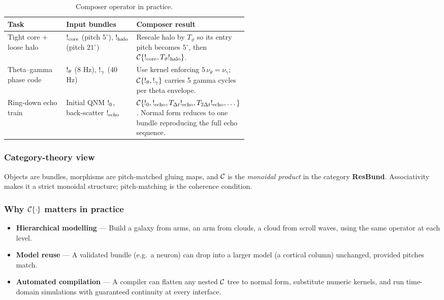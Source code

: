 \begin{table}[H]
  \small
  \centering
  \caption{Composer operator in practice.}
  \label{tab:composer-examples}
  \renewcommand{\arraystretch}{1.15}
  \begin{tabularx}{\linewidth}{@{}p{0.25\linewidth} p{0.30\linewidth} X@{}}
    \toprule
    \textbf{Task}                  & \textbf{Input bundles}                                               & \textbf{Composer result} \\
    \midrule
    Tight core + loose halo        & \(\mathsf{!}_{\mathrm{core}}\) (pitch \(5^\circ\)), \(\mathsf{!}_{\mathrm{halo}}\) (pitch \(21^\circ\)) &
      Rescale halo by \(T_{\vartheta}\) so its entry pitch becomes \(5^\circ\), then \(\mathcal{C}\{\mathsf{!}_{\mathrm{core}},T_{\vartheta}\mathsf{!}_{\mathrm{halo}}\}\). \\
    Theta–gamma phase code         & \(\mathsf{!}_{\theta}\) (8 Hz), \(\mathsf{!}_{\gamma}\) (40 Hz)                       &
      Use kernel enforcing \(5\,\nu_{\theta}=\nu_{\gamma}\); \(\mathcal{C}\{\mathsf{!}_{\theta},\mathsf{!}_{\gamma}\}\) carries 5 gamma cycles per theta envelope. \\
    Ring-down echo train           & Initial QNM \(\mathsf{!}_{0}\), back-scatter \(\mathsf{!}_{\mathrm{echo}}\)           &
      \(\mathcal{C}\{\mathsf{!}_{0},\mathsf{!}_{\mathrm{echo}},T_{\Delta t}\mathsf{!}_{\mathrm{echo}},T_{2\Delta t}\mathsf{!}_{\mathrm{echo}},\dots\}\). Normal form reduces to one bundle reproducing the full echo sequence. \\
    \bottomrule
  \end{tabularx}
\end{table}

\subsubsection{Category-theory view}

Objects are bundles, morphisms are pitch-matched gluing maps, and \(\mathcal{C}\) is the \emph{monoidal product} in the category \textbf{ResBund}. Associativity makes it a strict monoidal structure; pitch-matching is the coherence condition.

\subsubsection{Why \(\mathcal{C}\{\cdot\}\) matters in practice}

\begin{itemize}[leftmargin=1.5em]
  \item \textbf{Hierarchical modelling} — Build a galaxy from arms, an arm from clouds, a cloud from scroll waves, using the same operator at each level.
  \item \textbf{Model reuse} — A validated bundle (e.g.\ a neuron) can drop into a larger model (a cortical column) unchanged, provided pitches match.
  \item \textbf{Automated compilation} — A compiler can flatten any nested \(\mathcal{C}\) tree to normal form, substitute numeric kernels, and run time-domain simulations with guaranteed continuity at every interface.
\end{itemize}

